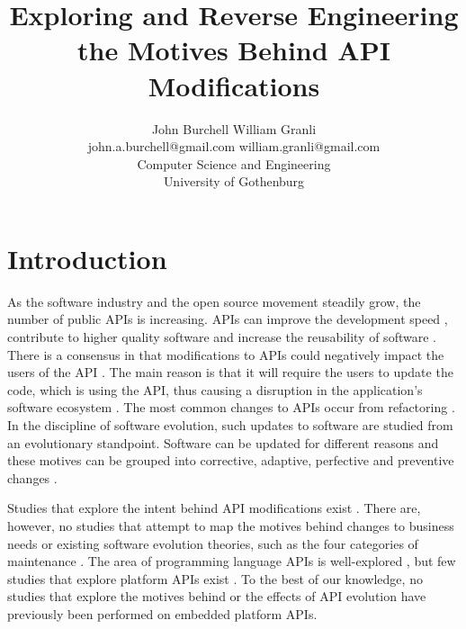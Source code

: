 \documentclass[10pt,twocolumn]{article}
\title{Exploring and Reverse Engineering the Motives Behind API Modifications}
\begin{document}


\author{John Burchell \qquad William Granli \\
		john.a.burchell@gmail.com \qquad william.granli@gmail.com \\
		Computer Science and Engineering  \\
		University of Gothenburg }


\maketitle





\section{Introduction}
As the software industry and the open source movement steadily grow, the number of public APIs is increasing. APIs can improve the development speed \cite{stylos2006comparing}, contribute to higher quality software \cite{stylos2006comparing} and increase the reusability of software \cite{afonso2012evaluating}. There is a consensus in that modifications to APIs could negatively impact the users of the API \cite{google_talk} \cite{mcdonnell2013empirical} \cite{robbes2012developers} \cite{henning2007api}. The main reason is that it will require the users to update the code, which is using the API, thus causing a disruption in the application's software ecosystem \cite{messerschmitt2005software}. The most common changes to APIs occur from refactoring \cite{dig2005role} \cite{xing2006refactoring}. 
In the discipline of software evolution, such updates to software are studied from an evolutionary standpoint. Software can be updated for different reasons and these motives can be grouped into corrective, adaptive, perfective and preventive changes \cite{lientz1980software} \cite{iso}. 

Studies that explore the intent behind API modifications exist \cite{hou2011exploring}. There are, however, no studies that attempt to map the motives behind changes to business needs or existing software evolution theories, such as the four categories of maintenance \cite{lientz1980software} \cite{iso}. The area of programming language APIs is well-explored \cite{hou2011exploring} \cite{shi2011empirical}, but few studies that explore platform APIs exist \cite{robbes2012developers}. To the best of our knowledge, no studies that explore the motives behind or the effects of API evolution have previously been performed on embedded platform APIs. 
\end{document}
